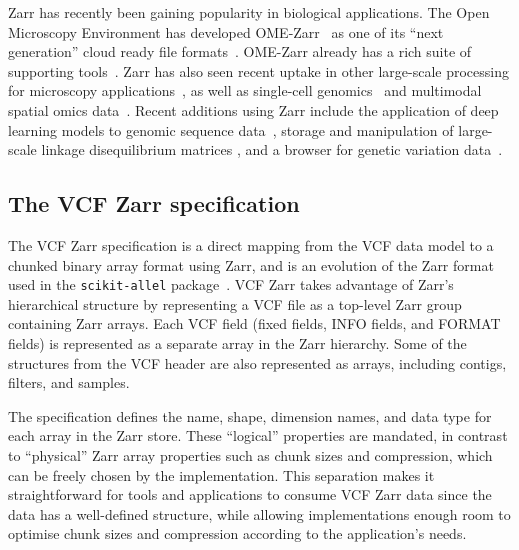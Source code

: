 \documentclass[a4paper,num-refs]{oup-contemporary}
\begin{document}
Zarr has recently been gaining popularity in biological applications.
The Open Microscopy Environment has developed OME-Zarr~\cite{moore2023ome} as one
of its ``next generation'' cloud ready file formats~\citep{moore2021ome}.
OME-Zarr already has a rich suite of supporting
tools~\cite{moore2023ome,rzepka2023toward}.
Zarr has also seen recent uptake in other large-scale processing for
microscopy applications~\citep{ruan2024image}, as well as
single-cell genomics~\citep{dhapola2022scarf,virshup2023scverse}
and multimodal spatial omics
data~\citep{marconato2024spatialdata,baker2023emobject}.
Recent additions using Zarr include the application of deep learning
models to genomic sequence data~\citep{klie2023predictive}, storage and
manipulation of large-scale linkage disequilibrium matrices \cite{zabad2023fast},
and a browser for genetic variation data~\citep{konig2023divbrowse}.

\subsection{The VCF Zarr specification}
The VCF Zarr specification is a direct mapping from the VCF data model
to a chunked binary array format using Zarr,
and is an evolution of the Zarr format used in the \texttt{scikit-allel}
package~\citep{miles2023scikit}.
VCF Zarr takes advantage
of Zarr's hierarchical structure by representing a VCF file as a top-level
Zarr group containing Zarr arrays. Each VCF field (fixed fields, INFO fields,
and FORMAT fields) is represented as a separate array in the Zarr hierarchy.
Some of the structures from the VCF header are also represented as arrays,
including contigs, filters, and samples.

The specification defines the name, shape, dimension names, and data type
for each array in the Zarr store. These ``logical'' properties are mandated,
in contrast to ``physical'' Zarr array properties such as chunk sizes and
compression, which can be freely chosen by the implementation. This
separation makes it straightforward for tools and applications to consume
VCF Zarr data since the data has a well-defined structure, while allowing
implementations enough room to optimise chunk sizes and compression
according to the application's needs.
\end{document}
